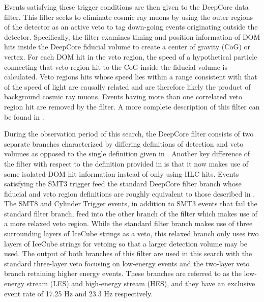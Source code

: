 \documentclass[manuscript]{aastex}
\begin{document}
Events satisfying these trigger conditions are then given to the DeepCore data filter. This filter seeks to eliminate cosmic ray muons by using the outer regions of the detector as an active veto to tag down-going events originating outside the detector. Specifically, the filter examines timing and position information of DOM hits inside the DeepCore fiducial volume to create a center of gravity (CoG) or vertex. For each DOM hit in the veto region, the speed of a hypothetical particle connecting that veto region hit to the CoG inside the fiducial volume is calculated. Veto regions hits whose speed lies within a range consistent with that of the speed of light are causally related and are therefore likely the product of background cosmic ray muons. Events having more than one correlated veto region hit are removed by the filter. A more complete description of this filter can be found in \cite{2012APh....35..615A}.

During the observation period of this search, the DeepCore filter consists of two separate branches characterized by differing definitions of detection and veto volumes as opposed to the single definition given in \cite{2012APh....35..615A}. Another key difference of the filter with respect to the definition provided in \cite{2012APh....35..615A} is that it now makes use of some isolated DOM hit information instead of only using HLC hits. Events satisfying the SMT3 trigger feed the standard DeepCore filter branch whose fiducial and veto region definitions are roughly equivalent to those described in \cite{2012APh....35..615A}. The SMT8 and Cylinder Trigger events, in addition to SMT3 events that fail the standard filter branch, feed into the other branch of the filter which makes use of a more relaxed veto region. While the standard filter branch makes use of three surrounding layers of IceCube strings as a veto, this relaxed branch only uses two layers of IceCube strings for vetoing so that a larger detection volume may be used. The output of both branches of this filter are used in this search with the standard three-layer veto focusing on low-energy events and the two-layer veto branch retaining higher energy events. These branches are referred to as the low-energy stream (LES) and high-energy stream (HES), and they have an exclusive event rate of 17.25 Hz and 23.3 Hz respectively.
\end{document}
